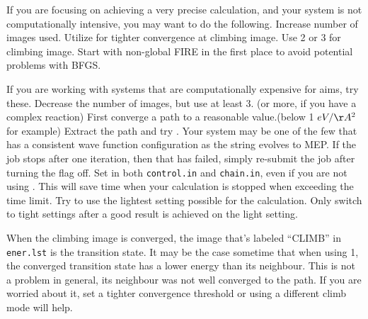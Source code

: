 If you are focusing on achieving a very precise calculation, and your system is not computationally intensive, you may want to do the following. Increase number of images used. Utilize  for tighter convergence at climbing image. Use  2 or 3 for climbing image. Start with non-global FIRE in the first place to avoid potential problems with BFGS.

If you are working with systems that are computationally expensive for aims, try these. Decrease the number of images, but use at least 3. (or more, if you have a complex reaction) First converge a path to a reasonable value.(below 1 $eV/\AA^{2}$ for example) Extract the path and try . Your system may be one of the few that has a consistent wave function configuration as the string evolves to MEP. If the job stops after one iteration, then that has failed, simply re-submit the job after turning the flag off. Set  in both \texttt{control.in} and \texttt{chain.in}, even if you are not using . This will save time when your calculation is stopped when exceeding the time limit. Try to use the lightest setting possible for the calculation. Only switch to tight settings after a good result is achieved on the light setting. 

When the climbing image is converged, the image that's labeled ``CLIMB'' in \texttt{ener.lst} is the transition state. It may be the case sometime that when using  1, the converged transition state has a lower energy than its neighbour. This is not a problem in general, its neighbour was not well converged to the path. If you are worried about it, set a tighter convergence threshold or using a different climb mode will help. 
